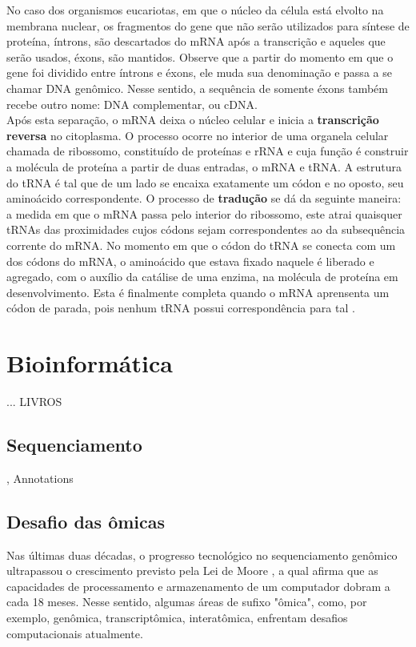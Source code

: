 
\indent No caso dos organismos eucariotas, em que o núcleo da célula está elvolto na membrana nuclear, os fragmentos do gene que não serão utilizados para síntese de proteína, íntrons, são descartados do mRNA após a transcrição e aqueles que serão usados, éxons, são mantidos. Observe que a partir do momento em que o gene foi dividido entre íntrons e éxons, ele muda sua denominação e passa a se chamar DNA genômico. Nesse sentido, a sequência de somente éxons também recebe outro nome: DNA complementar, ou cDNA. \\

\indent Após esta separação, o mRNA deixa o núcleo celular e inicia a \textbf{transcrição reversa} no citoplasma. O processo ocorre no interior de uma organela celular chamada de ribossomo, constituído de proteínas e rRNA e cuja função é construir a molécula de proteína a partir de duas entradas, o mRNA e tRNA. A estrutura do tRNA é tal que de um lado se encaixa exatamente um códon e no oposto, seu aminoácido correspondente. O processo de \textbf{tradução} se dá da seguinte maneira: a medida em que o mRNA passa pelo interior do ribossomo, este atrai quaisquer tRNAs das proximidades cujos códons sejam correspondentes ao da subsequência corrente do mRNA. No momento em que o códon do tRNA se conecta com um dos códons do mRNA, o aminoácido que estava fixado naquele é liberado e agregado, com o auxílio da catálise de uma enzima, na molécula de proteína em desenvolvimento. Esta é finalmente completa quando o mRNA aprensenta um códon de parada, pois nenhum tRNA possui correspondência para tal \cite{setubal97}. \\


\section{Bioinformática} \label{bioinformatica}
 \indent ... LIVROS
\subsection{Sequenciamento} 

\indent \cite{mardis08}, Annotations


\subsection{Desafio das ômicas}

\indent Nas últimas duas décadas, o progresso tecnológico no sequenciamento genômico ultrapassou o crescimento previsto pela Lei de Moore \cite{berger13}, a qual afirma que as capacidades de processamento e armazenamento de um computador dobram a cada 18 meses. Nesse sentido, algumas áreas de sufixo "ômica", como, por exemplo, genômica, transcriptômica, interatômica, enfrentam desafios computacionais atualmente. \\

